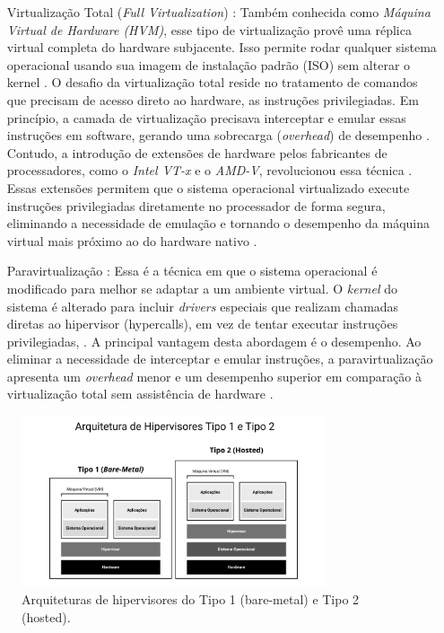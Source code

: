 \begin{itemize}
\begin{itemize}
    \item[Virtualização Total (\textit{Full Virtualization})]: 
    Também conhecida como \textit{Máquina Virtual de Hardware (HVM)}, esse tipo de virtualização provê uma réplica virtual completa do hardware subjacente. Isso permite rodar qualquer sistema operacional usando sua imagem de instalação padrão (ISO) sem alterar o kernel \cite{carissimi2008}. 
    O desafio da virtualização total reside no tratamento de comandos que precisam de acesso direto ao hardware, as instruções privilegiadas. Em princípio, a camada de virtualização precisava interceptar e emular essas instruções em software, gerando uma sobrecarga (\textit{overhead}) de desempenho \cite{carissimi2008}.
    Contudo, a introdução de extensões de hardware pelos fabricantes de processadores, como o \textit{Intel VT-x} e o \textit{AMD-V}, revolucionou essa técnica \cite{carissimi2008}. Essas extensões permitem que o sistema operacional virtualizado execute instruções privilegiadas diretamente no processador de forma segura, eliminando a necessidade de emulação e tornando o desempenho da máquina virtual mais próximo ao do hardware nativo \cite{chawla2025}.

    \item[Paravirtualização]: 
    Essa é a técnica em que o sistema operacional é modificado para melhor se adaptar a um ambiente virtual. O \textit{kernel} do sistema é alterado para incluir \textit{drivers} especiais que realizam chamadas diretas ao hipervisor (hypercalls), em vez de tentar executar instruções privilegiadas, \cite{carissimi2008}.
    A principal vantagem desta abordagem é o desempenho. Ao eliminar a necessidade de interceptar e emular instruções, a paravirtualização apresenta um \textit{overhead} menor e um desempenho superior em comparação à virtualização total sem assistência de hardware \cite{carissimi2008}.
\end{itemize}

\begin{figure}[htb]
    \centering
    \includegraphics[width=0.8\textwidth]{figuras/Figura 2 - Arquitetura de Hipervisores.png}
    \caption{Arquiteturas de hipervisores do Tipo 1 (bare-metal) e Tipo 2 (hosted).}
    \label{fig:arquitetura-hipervisores}
\end{figure}


\end{itemize}
